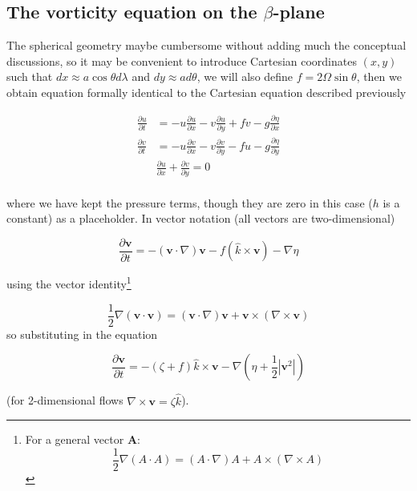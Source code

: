 \subsection{\texorpdfstring{The vorticity equation on the
		\(\beta\)-plane}{The vorticity equation on the \textbackslash beta-plane}}\label{the-vorticity-equation-on-the-beta-plane}

The spherical geometry maybe cumbersome without adding much the
conceptual discussions, so it may be convenient to introduce Cartesian
coordinates \((x,y)\) such that \(dx \approx a \cos\theta d \lambda\)
and \(dy \approx a d\theta\), we will also define
\(f= 2\Omega \sin\theta\), then we obtain equation formally identical to
the Cartesian equation described previously

\[\begin{aligned}
		\frac{\partial u}{\partial t} & = -u \frac{\partial u}{\partial x} -v \frac{\partial u}{\partial y} + f v -g\frac{\partial \eta}{\partial x} \\
		\frac{\partial v}{\partial t} & = -u \frac{\partial v}{\partial x} -v \frac{\partial v}{\partial y} - f u -g\frac{\partial \eta}{\partial y} \\
		                              & \frac{\partial u}{\partial x}+\frac{\partial v}{\partial y} = 0                                              \\
	\end{aligned}\]

where we have kept the pressure terms, though they are zero in this case
($h$ is a constant) as a placeholder. In vector notation (all vectors are
two-dimensional)

\[\frac{\partial \mathbf{v}}{\partial t} = - (\mathbf{v} \cdot \nabla)\mathbf{v} - f(\hat{k}\times \mathbf{v}) - \nabla \eta\]

using the vector identity\footnote{For a general vector $\mathbf{A}$: \[\frac{1}{2}\nabla(A\cdot A) = (A \cdot\nabla)A + A\times(\nabla\times A)\]}


\[\frac{1}{2}\nabla(\mathbf{v}\cdot \mathbf{v}) = (\mathbf{v} \cdot\nabla)\mathbf{v} + \mathbf{v}\times(\nabla\times \mathbf{v})\]
so substituting in the equation

\begin{equation}\label{eq.21}
	\frac{\partial \mathbf{v}}{\partial t} = -(\zeta + f) \hat{k}\times \mathbf{v} -\nabla(\eta+\frac{1}{2}|\mathbf{v}^2|)
\end{equation}

(for 2-dimensional flows \(\nabla \times \mathbf{v} = \zeta \hat{k}\)).

